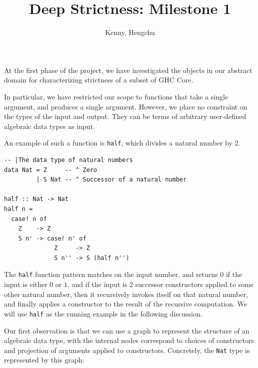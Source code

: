 \documentclass{article}
\title{Deep Strictness: Milestone 1}
\author{Kenny, Hengchu}
\begin{document}
\maketitle

At the first phase of the project, we have investigated the objects in
our abstract domain for characterizing strictness of a subset of GHC
Core.

In particular, we have restricted our scope to functions that take a
single argument, and produces a single argument. However, we place no
constraint on the types of the input and output. They can be terms of
arbitrary user-defined algebraic data types as input.

An example of such a function is \verb|half|, which divides a natural
number by $2$.

\begin{verbatim}
-- |The data type of natural numbers
data Nat = Z     -- ^ Zero
         | S Nat -- ^ Successor of a natural number

half :: Nat -> Nat
half n =
  case! n of
    Z    -> Z
    S n' -> case! n' of
              Z     -> Z
              S n'' -> S (half n'')
\end{verbatim}

The \verb|half| function pattern matches on the input number, and
returns $0$ if the input is either $0$ or $1$, and if the input is $2$
successor constructors applied to some other natural number, then it
recursively invokes itself on that natural number, and finally applies
a constructor to the result of the recursive computation. We will use
\verb|half| as the running example in the following discussion.

Our first observation is that we can use a graph to represent the
structure of an algebraic data type, with the internal nodes
correspond to choices of constructors and projection of arguments
applied to constructors. Concretely, the \verb|Nat| type is
represented by this graph:

\begin{figure}[H]
  \centering
{}
\end{figure}
\end{document}
